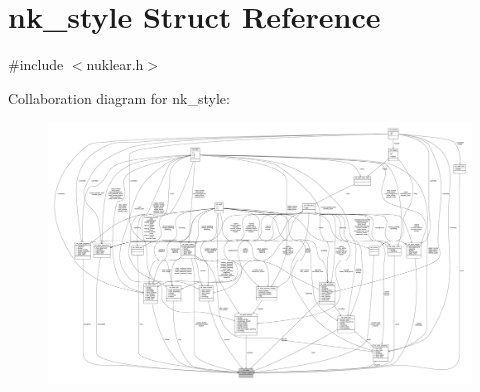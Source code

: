 \hypertarget{structnk__style}{}\section{nk\+\_\+style Struct Reference}
\label{structnk__style}


{\ttfamily \#include $<$nuklear.\+h$>$}



Collaboration diagram for nk\+\_\+style\+:
\nopagebreak
\begin{figure}[H]
\begin{center}
\leavevmode
\includegraphics[width=350pt]{structnk__style__coll__graph}
\end{center}
\end{figure}
